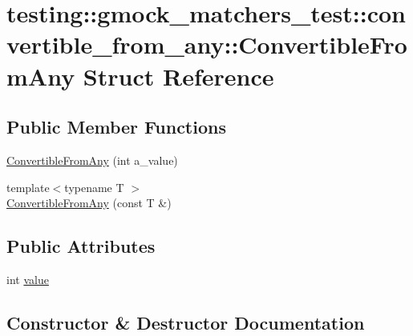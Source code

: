 \hypertarget{structtesting_1_1gmock__matchers__test_1_1convertible__from__any_1_1ConvertibleFromAny}{}\section{testing\+::gmock\+\_\+matchers\+\_\+test\+::convertible\+\_\+from\+\_\+any\+::Convertible\+From\+Any Struct Reference}
\label{structtesting_1_1gmock__matchers__test_1_1convertible__from__any_1_1ConvertibleFromAny}
\subsection*{Public Member Functions}
\begin{DoxyCompactItemize}
\item 
\mbox{\hyperlink{structtesting_1_1gmock__matchers__test_1_1convertible__from__any_1_1ConvertibleFromAny_a5bee1e70fa860c1219928f82006e2b2b}{Convertible\+From\+Any}} (int a\+\_\+value)
\item 
{\footnotesize template$<$typename T $>$ }\\\mbox{\hyperlink{structtesting_1_1gmock__matchers__test_1_1convertible__from__any_1_1ConvertibleFromAny_a1192b2a272c6ce8e6fc75a9448417a4f}{Convertible\+From\+Any}} (const T \&)
\end{DoxyCompactItemize}
\subsection*{Public Attributes}
\begin{DoxyCompactItemize}
\item 
int \mbox{\hyperlink{structtesting_1_1gmock__matchers__test_1_1convertible__from__any_1_1ConvertibleFromAny_a4fdd0c9f00eced05d2af01b3cf28889f}{value}}
\end{DoxyCompactItemize}


\subsection{Constructor \& Destructor Documentation}
\mbox{\label{structtesting_1_1gmock__matchers__test_1_1convertible__from__any_1_1ConvertibleFromAny_a5bee1e70fa860c1219928f82006e2b2b}} 
